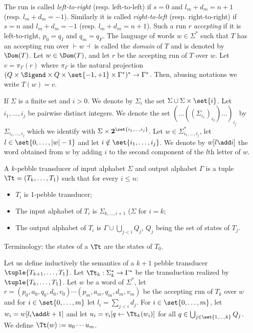 The run is called \emph{left-to-right} (resp. left-to-left) if $s=0$ and $l_m+d_m=n+1$ (resp. $l_m+d_m=-1$). Similarly it is called \emph{right-to-left} (resp. right-to-right) if $s=n$ and $l_m+d_m=-1$ (resp. $l_m+d_m=n+1$).
Such a run $r$ \emph{accepting} if it is left-to-right, $p_0=q_I$ and $q_m=q_F$.
The language of words $w\in \Sigma^*$ such that $T$ has an accepting run over $\vdash w\dashv$ is called the \emph{domain} of $T$ and is denoted by $\Dom(T)$. Let $w\in \Dom(T)$, and let $r$ be the accepting run of $T$ over $w$. Let $v=\pi_\Gamma(r)$ where $\pi_\Gamma$ is the natural projection $(Q\times \Sigend \times Q\times \set{-1,+1}\times \Gamma^*)^* \rightarrow \Gamma^*$.
Then, abusing notations we write $T(w)=v$.

If $\Sigma$ is a finite set and $i>0$. We denote by $\Sigma_i$ the set $\Sigma\cup \Sigma\times {\set{i}}$.
Let $i_1,\ldots,i_j$ be pairwise distinct integers. We denote the set $(\ldots((\Sigma_{i_1})_{i_2})\ldots)_{i_j}$ by $\Sigma_{i_1,\ldots,i_j}$ which we identify with $\Sigma\times \mathbf 2^{\set{i_1,\ldots,i_j}}$.
Let $w\in \Sigma_{i_1,\ldots,i_j}^*$, let $l\in \set{0,\ldots,|w|-1}$ and let $i\notin \set{i_1,\ldots,i_j}$.
We denote by $w[l\add i]$ the word obtained from $w$ by adding $i$ to the second component of the $l$th letter of $w$.

\begin{definition}
A $k$-pebble transducer of input alphabet $\Sigma$ and output alphabet $\Gamma$ is a tuple $\Tt=(T_k,\dots,T_{1})$ such that for every $i\leq n$:
\begin{itemize}
\item  $T_i$ is 1-pebble transducer;
\item  The input alphabet of $T_i$ is $\Sigma_{k,\ldots,i+1}$ ($\Sigma$ for $i=k$;
\item  The output alphabet of $T_i$ is $\Gamma\cup\bigcup_{j<i} Q_j$, $Q_j$ being the set of states of $T_j$.
\end{itemize} 
Terminology: the states of a $\Tt$ are the states of $T_0$. 
\end{definition}

Let us define inductively the semantics of a $k+1$ pebble transducer $\tuple{T_{k+1},\ldots, T_1}$.
Let $\Tt_k:\Sigma_k^*\rightarrow \Gamma^*$ be the transduction realized by$\tuple{T_{k},\ldots, T_1}$.
Let $w$ be a word of $\Sigma^*$, let $r=(p_0,a_0,q_0,d_0,v_0)\cdots (p_m,a_m,q_m,d_m,v_m)$ be the accepting run of $T_k$ over $w$ and for  $i\in \set{0,\ldots,m}$ let  $l_i=\sum_{j< i }d_j$.
For  $i\in \set{0,\ldots,m}$, let $w_i=w[l_i\add k+1]$ and let $u_i=v_i[q\leftarrow \Tt_k(w_i)]$ for all $q\in \bigcup_{j\in \set{1,\ldots,k}}Q_j$.
We define $\Tt(w):=u_0\cdots u_m$.

